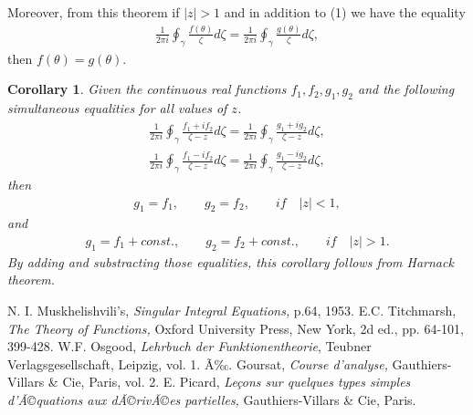 \documentclass[12pt]{article}
\newtheorem{corollary*}{Corollary}
\begin{document}
Moreover, from this theorem if $|z|>1$ and in addition to (1) we have the equality
\begin{align*}
\frac{1}{2\pi i}\oint_\gamma\frac{f(\theta)}{\zeta}d\zeta=
\frac{1}{2\pi i}\oint_\gamma\frac{g(\theta)}{\zeta}d\zeta,
\end{align*}
then $f(\theta)=g(\theta)$.
\begin{corollary*}
Given the continuous real functions $f_1,f_2,g_1,g_2$ and the following simultaneous equalities for all values of $z$.
\begin{align*}
\frac{1}{2\pi i}\oint_\gamma\frac{f_1+if_2}{\zeta-z}d\zeta=
\frac{1}{2\pi i}\oint_\gamma\frac{g_1+ig_2}{\zeta-z}d\zeta,
\end{align*}
\begin{align*}
\frac{1}{2\pi i}\oint_\gamma\frac{f_1-if_2}{\zeta-z}d\zeta=
\frac{1}{2\pi i}\oint_\gamma\frac{g_1-ig_2}{\zeta-z}d\zeta,
\end{align*}
then 
\begin{align*}
g_1=f_1, \qquad g_2=f_2, \qquad if \quad |z|<1,
\end{align*}
and
\begin{align*}
g_1=f_1+const., \qquad g_2=f_2+const., \qquad if \quad |z|>1.
\end{align*}
By adding and substracting those equalities, this corollary follows from Harnack theorem.
\end{corollary*}
\begin{thebibliography}{99}
N. I. Muskhelishvili's, {\em Singular Integral Equations,} p.64, 1953.
E.C. Titchmarsh, {\em The Theory of Functions,} Oxford University Press, New York, 2d ed., pp. 64-101, 399-428. 
W.F. Osgood, {\em Lehrbuch der Funktionentheorie}, Teubner Verlagsgesellschaft, Leipzig, vol. 1. 
Ã‰. Goursat, {\em Course d'analyse,} Gauthiers-Villars \& Cie, Paris, vol. 2. 
E. Picard, {\em Le\c cons sur quelques types simples d'Ã©quations aux dÃ©rivÃ©es partielles,} Gauthiers-Villars \& Cie, Paris. 
\end{thebibliography}





\end{document}
